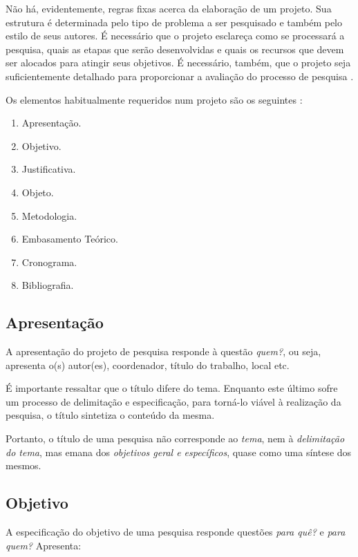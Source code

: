\documentclass[
	12pt,				%
    oneside,			%
	a4paper,			%
	english,			%
	french,				%
	spanish,			%
	brazil				%
	]{abntex2}
\begin{document}
Não há, evidentemente, regras fixas acerca da elaboração de um
projeto. Sua estrutura é determinada pelo tipo de problema a ser
pesquisado e também pelo estilo de seus autores. É necessário que o
projeto esclareça como se processará a pesquisa, quais as etapas que
serão desenvolvidas e quais os recursos que devem ser alocados para
atingir seus objetivos. É necessário, também, que o projeto seja
suficientemente detalhado para proporcionar a avaliação do processo
de pesquisa \cite{Gil}.

Os elementos habitualmente requeridos num projeto são os seguintes
\cite{Marconi}:

\begin{enumerate}
    \item Apresentação.
    \item Objetivo.
    \item Justificativa.
    \item Objeto.
    \item Metodologia.
    \item Embasamento Teórico.
    \item Cronograma.
    \item Bibliografia.
\end{enumerate}

\subsection{Apresentação}

A apresentação do projeto de pesquisa responde à questão
\emph{quem?}, ou seja, apresenta o(s) autor(es), coordenador,
título do trabalho, local etc.

É importante ressaltar que o título difere do tema. Enquanto este
último sofre um processo de delimitação e especificação, para
torná-lo viável à realização da pesquisa, o título sintetiza o
conteúdo da mesma.

Portanto, o título de uma pesquisa não corresponde ao \emph{tema},
nem à \emph{delimitação do tema}, mas emana dos \emph{objetivos
geral e específicos}, quase como uma síntese dos mesmos.

\subsection{Objetivo}

A especificação do objetivo de uma pesquisa responde questões
\emph{para quê?} e \emph{para quem?} Apresenta:
\end{document}
